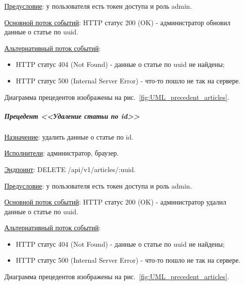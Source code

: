 \underline{Предусловие}: у пользователя есть токен доступа и роль admin.

\underline{Основной поток событий}: HTTP статус 200 (OK) - администратор обновил данные о статье по uuid. 

\underline{Альтернативный поток событий}:

\begin{itemize}
    \item HTTP статус 404 (Not Found) - данные о статье по uuid не найдены;
    \item HTTP статус 500 (Internal Server Error) - что-то пошло не так на сервере.
\end{itemize}

Диаграмма прецедентов изображены на рис.~\ref{fig:UML_precedent_articles}.


\subparagraph{Прецедент <<Удаление статьи по id>>} \hspace{0pt}

\underline{Назначение}: удалить данные о статье по id.

\underline{Исполнители}: администратор, браузер.

\underline{Эндпоинт}: DELETE /api/v1/articles/:uuid.

\underline{Предусловие}: у пользователя есть токен доступа и роль admin.

\underline{Основной поток событий}: HTTP статус 200 (OK) - администратор удалил данные о статье по uuid. 

\underline{Альтернативный поток событий}:

\begin{itemize}
    \item HTTP статус 404 (Not Found) - данные о статье по uuid не найдены;
    \item HTTP статус 500 (Internal Server Error) - что-то пошло не так на сервере.
\end{itemize}

Диаграмма прецедентов изображены на рис.~\ref{fig:UML_precedent_articles}.


